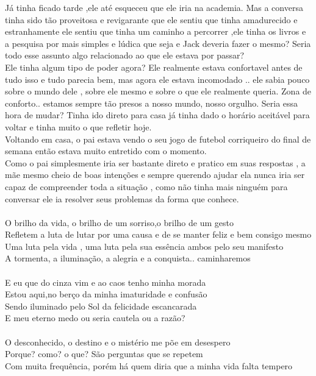 \documentclass{book}
\begin{document}
Já tinha ficado tarde ,ele até esqueceu que ele iria na academia. Mas a conversa tinha sido tão proveitosa e revigarante que ele sentiu que tinha amadurecido  e estranhamente ele sentiu que tinha um caminho a percorrer   ,ele tinha os livros e a pesquisa por mais simples e lúdica que seja e Jack deveria fazer o mesmo? Seria todo esse assunto algo relacionado ao que ele estava por passar? \\
Ele tinha algum tipo de poder agora? Ele realmente estava confortavel antes de tudo isso e tudo parecia bem, mas agora ele estava incomodado .. ele sabia pouco sobre o mundo dele , sobre ele mesmo e sobre o que ele realmente queria. Zona de conforto.. estamos sempre tão presos a nosso mundo, nosso orgulho. Seria essa hora de mudar? Tinha ido direto para casa já tinha dado o horário aceitável para voltar e tinha muito o que refletir hoje. \\
Voltando em casa, o pai estava vendo o seu jogo de futebol corriqueiro do final de semana então estava muito entretido com o momento.\\
Como o pai simplesmente iria ser bastante direto e pratico em suas respostas , a mãe mesmo cheio de boas intenções e sempre querendo ajudar ela nunca iria ser capaz de compreender toda a situação , como não tinha mais ninguém para conversar ele ia resolver seus problemas da forma que conhece.\\
\\
O brilho da vida, o brilho de um sorriso,o brilho de um gesto\\
Refletem a luta de lutar por uma causa e de se manter feliz e bem consigo mesmo\\
Uma luta pela vida , uma luta pela sua essência ambos pelo seu manifesto\\
A tormenta, a iluminação, a alegria e a conquista.. caminharemos\\
\\
E eu que do cinza vim e ao caos tenho minha morada\\
Estou aqui,no berço da minha imaturidade e confusão\\
Sendo iluminado pelo Sol da felicidade escancarada\\
E meu eterno medo ou seria cautela ou a razão?\\
\\
O desconhecido, o destino e o mistério me põe em desespero\\
Porque? como?  o que? São perguntas que se repetem\\
Com muita frequência, porém há quem diria que a minha vida falta tempero\\ 
\end{document}
